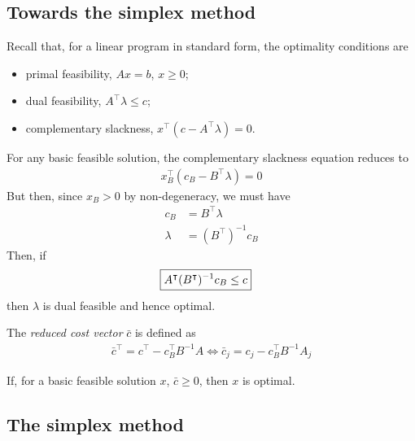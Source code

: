 \documentclass{../../template/note}
\begin{document}
    \subsection{Towards the simplex method}

    Recall that, for a linear program in standard form, the optimality conditions are
    \begin{itemize}
        \item primal feasibility, $Ax = b$, $x \geq 0$;
        \item dual feasibility, $A^\intercal \lambda \leq c$;
        \item complementary slackness, $x^\intercal (c-A^\intercal \lambda) = 0$.
    \end{itemize}
    For any basic feasible solution, the complementary slackness equation reduces to
    \begin{align*}
        x_B^\intercal (c_B-B^\intercal \lambda) = 0
    \end{align*}
    But then, since $x_B > 0$ by non-degeneracy, we must have
    \begin{align*}
        c_B &= B^\intercal \lambda \\
        \lambda &= (B^\intercal)^{-1} c_B
    \end{align*}
    Then, if
    \begin{align*}
        \Aboxed{A^\intercal (B^\intercal)^{-1} c_B \leq c}
    \end{align*}
    then $\lambda$ is dual feasible and hence optimal.
    
    \begin{definition}
        The \emph{reduced cost vector} $\bar c$ is defined as
        \begin{align*}
            \bar c^\intercal = c^\intercal - c_B^\intercal B^{-1} A \iff \bar c_j = c_j - c_B^\intercal B^{-1} A_j
        \end{align*}
    \end{definition}
    
    If, for a basic feasible solution $x$, $\bar c \geq 0$, then $x$ is optimal.

    \subsection{The simplex method}
\end{document}
